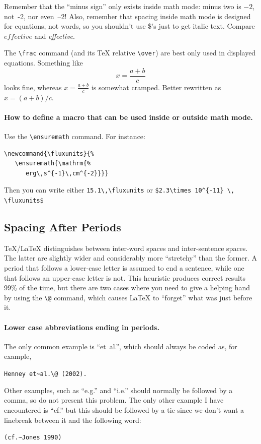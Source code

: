 \documentclass[preprint]{rmxac}
\newcommand{\CS}[1]{\texttt{\textbackslash #1}}
\newenvironment{Example}
{\begin{list}{}{\setlength{\leftmargin}{5pt}\setlength{\rightmargin}{5pt}}\item[]}
  {\end{list}}
\begin{document}
Remember that the ``minus sign'' only exists inside math mode: minus
two is $-2$, not~-2, nor \hbox{even --2!} Also, remember that spacing inside
math mode is designed for equations, not words, so you shouldn't use
\$'s just to get italic text. Compare $effective$ and
\textit{effective}. 

The \CS{frac} command (and its \TeX{} relative \CS{over}) are best
only used in displayed equations. Something like 
\begin{equation}
  \label{eq:one}
  x = \frac { a + b } { c } 
\end{equation}
looks fine, whereas $x = \frac { a + b } { c }$ is somewhat cramped.
Better rewritten as $x = (a + b) / c $. 

\paragraph{How to define a macro that can be used inside or outside
  math mode.} Use the \CS{ensuremath} command. For instance: 
\begin{verbatim}
\newcommand{\fluxunits}{%
   \ensuremath{\mathrm{%
      erg\,s^{-1}\,cm^{-2}}}}
\end{verbatim}
Then you can write either \verb+15.1\,\fluxunits+ or
\verb+$2.3\times 10^{-11} \, \fluxunits$+


\subsection{Spacing After Periods}
\label{sec:space}

\TeX{}/\LaTeX{} distinguishes between inter-word spaces and
inter-sentence spaces. The latter are slightly wider and considerably
more ``stretchy'' than the former. A period that follows a lower-case
letter is assumed to end a sentence, while one that follows an
upper-case letter is not.  This heuristic produces correct results
99\% of the time, but there are two cases where you need to give a
helping hand by using the \verb+\@+ command, which causes \LaTeX{} to
``forget'' what was just before it. 


\paragraph{Lower case abbreviations ending in periods.} The only common
example is ``et~al.\@'', which should always be coded as, for example,
\begin{Example}
  \verb+Henney et~al.\@ (2002).+
\end{Example} 
Other examples, such as ``e.g.\@'' and ``i.e.\@'' should normally be
followed by a comma, so do not present this problem. The only other
example I have encountered is ``cf.\@'' but this should be followed by
a tie since we don't want a linebreak between it and the following
word:
\begin{Example}
  \verb+(cf.~Jones 1990)+
\end{Example}
\end{document}
